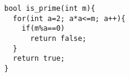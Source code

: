 \begin{verbatim}
bool is_prime(int m){
  for(int a=2; a*a<=m; a++){
    if(m%a==0)
      return false;
  }
  return true;
}
\end{verbatim}